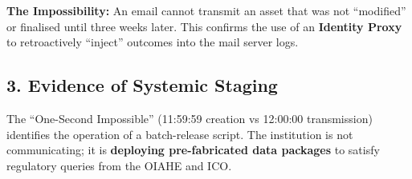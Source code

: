 \documentclass{embassy}
\begin{document}
\textbf{The Impossibility:} An email cannot transmit an asset that was not ``modified'' or finalised until three weeks later. This confirms the use of an \textbf{Identity Proxy} to retroactively ``inject'' outcomes into the mail server logs.

\subsection*{3. Evidence of Systemic Staging}
The ``One-Second Impossible'' (11:59:59 creation vs 12:00:00 transmission) identifies the operation of a batch-release script. The institution is not communicating; it is \textbf{deploying pre-fabricated data packages} to satisfy regulatory queries from the OIAHE and ICO.
\end{document}
